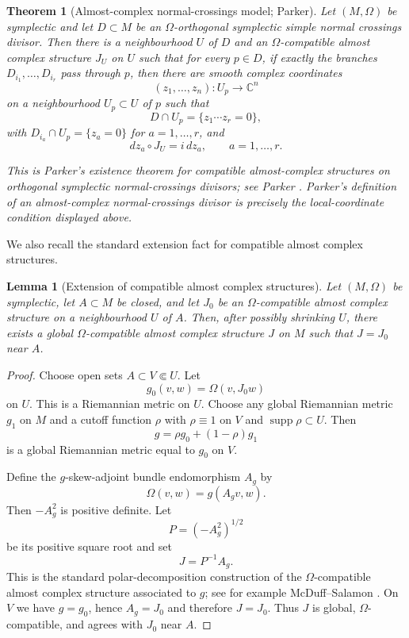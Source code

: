 \documentclass[11pt]{article}
\newtheorem{theorem}{Theorem}
\newtheorem{lemma}{Lemma}
\begin{document}
\begin{theorem}[Almost-complex normal-crossings model; Parker]
\label{thm:parker}
Let $(M,\Omega)$ be symplectic and let $D\subset M$ be an
$\Omega$-orthogonal symplectic simple normal crossings divisor.  Then there is
a neighbourhood $U$ of $D$ and an $\Omega$-compatible almost complex structure
$J_U$ on $U$ such that for every $p\in D$, if exactly the branches
$D_{i_1},\ldots,D_{i_r}$ pass through $p$, then there are smooth complex
coordinates
\[
(z_1,\ldots,z_n):U_p\longrightarrow \mathbb C^n
\]
on a neighbourhood $U_p\subset U$ of $p$ such that
\[
D\cap U_p=\{z_1\cdots z_r=0\},
\]
with $D_{i_a}\cap U_p=\{z_a=0\}$ for $a=1,\ldots,r$, and
\[
dz_a\circ J_U=i\,dz_a,\qquad a=1,\ldots,r .
\]

This is Parker's existence theorem for compatible almost-complex structures on
orthogonal symplectic normal-crossings divisors; see Parker
\cite[Section 4]{Parker}.  Parker's definition of an almost-complex
normal-crossings divisor is precisely the local-coordinate condition displayed
above.
\end{theorem}

We also recall the standard extension fact for compatible almost complex
structures.

\begin{lemma}[Extension of compatible almost complex structures]
\label{lem:extension}
Let $(M,\Omega)$ be symplectic, let $A\subset M$ be closed, and let $J_0$ be an
$\Omega$-compatible almost complex structure on a neighbourhood $U$ of $A$.
Then, after possibly shrinking $U$, there exists a global $\Omega$-compatible
almost complex structure $J$ on $M$ such that $J=J_0$ near $A$.
\end{lemma}

\begin{proof}
Choose open sets $A\subset V\Subset U$.  Let
\[
g_0(v,w)=\Omega(v,J_0w)
\]
on $U$.  This is a Riemannian metric on $U$.  Choose any global Riemannian
metric $g_1$ on $M$ and a cutoff function $\rho$ with $\rho\equiv 1$ on $V$ and
$\operatorname{supp}\rho\subset U$.  Then
\[
g=\rho g_0+(1-\rho)g_1
\]
is a global Riemannian metric equal to $g_0$ on $V$.

Define the $g$-skew-adjoint bundle endomorphism $A_g$ by
\[
\Omega(v,w)=g(A_gv,w).
\]
Then $-A_g^2$ is positive definite.  Let
\[
P=(-A_g^2)^{1/2}
\]
be its positive square root and set
\[
J=P^{-1}A_g .
\]
This is the standard polar-decomposition construction of the $\Omega$-compatible
almost complex structure associated to $g$; see for example McDuff--Salamon
\cite[Proposition 2.50]{MS}.  On $V$ we have $g=g_0$, hence $A_g=J_0$ and
therefore $J=J_0$.  Thus $J$ is global, $\Omega$-compatible, and agrees with
$J_0$ near $A$.
\end{proof}
\end{document}
